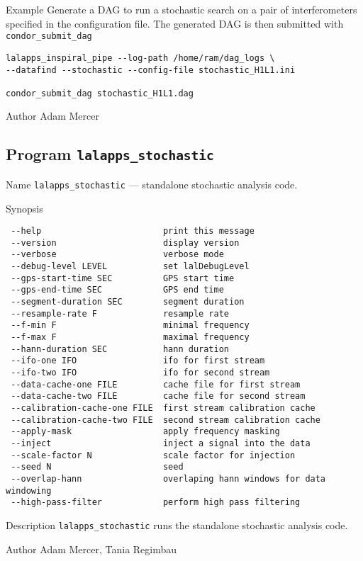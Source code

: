 \begin{entry}
\item[Example]
Generate a DAG to run a stochastic search on a pair of interferometers
specified in the configuration file. The generated DAG is then submitted
with \texttt{condor\_submit\_dag}
\begin{verbatim}
lalapps_inspiral_pipe --log-path /home/ram/dag_logs \
--datafind --stochastic --config-file stochastic_H1L1.ini

condor_submit_dag stochastic_H1L1.dag
\end{verbatim}

\item[Author]
Adam Mercer
\end{entry}

\clearpage
\subsection{Program \texttt{lalapps\_stochastic}}
\label{program:lalapps-stochastic}

\begin{entry}
\item[Name]
\verb$lalapps_stochastic$ --- standalone stochastic analysis code.

\item[Synopsis]
\begin{verbatim}
 --help                        print this message
 --version                     display version
 --verbose                     verbose mode
 --debug-level LEVEL           set lalDebugLevel
 --gps-start-time SEC          GPS start time
 --gps-end-time SEC            GPS end time
 --segment-duration SEC        segment duration
 --resample-rate F             resample rate
 --f-min F                     minimal frequency
 --f-max F                     maximal frequency
 --hann-duration SEC           hann duration
 --ifo-one IFO                 ifo for first stream
 --ifo-two IFO                 ifo for second stream
 --data-cache-one FILE         cache file for first stream
 --data-cache-two FILE         cache file for second stream
 --calibration-cache-one FILE  first stream calibration cache
 --calibration-cache-two FILE  second stream calibration cache
 --apply-mask                  apply frequency masking
 --inject                      inject a signal into the data
 --scale-factor N              scale factor for injection
 --seed N                      seed
 --overlap-hann                overlaping hann windows for data windowing
 --high-pass-filter            perform high pass filtering
\end{verbatim}

\item[Description] \verb$lalapps_stochastic$ runs the standalone
stochastic analysis code.

\item[Author] 
Adam Mercer, Tania Regimbau
\end{entry}
